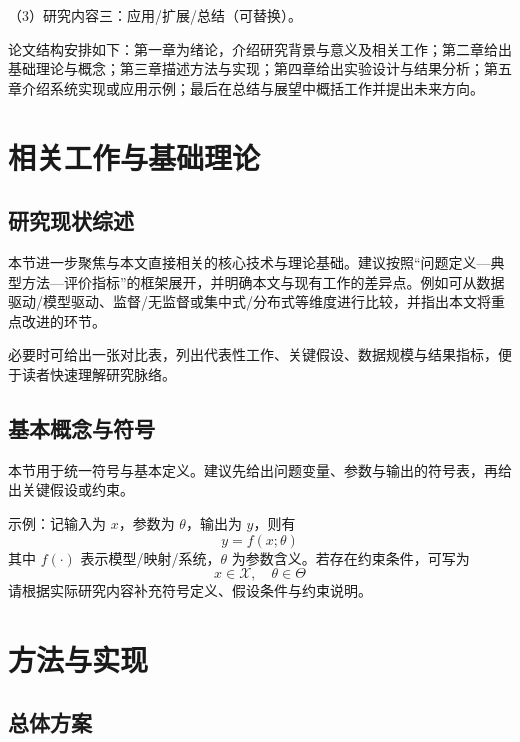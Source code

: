 \documentclass[unicode,master,submission,final]{scutthesis}
\begin{document}
（3）研究内容三：应用/扩展/总结（可替换）。

论文结构安排如下：第一章为绪论，介绍研究背景与意义及相关工作；第二章给出基础理论与概念；第三章描述方法与实现；第四章给出实验设计与结果分析；第五章介绍系统实现或应用示例；最后在总结与展望中概括工作并提出未来方向。

\chapter{相关工作与基础理论}

\section{研究现状综述}

本节进一步聚焦与本文直接相关的核心技术与理论基础。建议按照“问题定义—典型方法—评价指标”的框架展开，并明确本文与现有工作的差异点。例如可从数据驱动/模型驱动、监督/无监督或集中式/分布式等维度进行比较，并指出本文将重点改进的环节。

必要时可给出一张对比表，列出代表性工作、关键假设、数据规模与结果指标，便于读者快速理解研究脉络。

\section{基本概念与符号}

本节用于统一符号与基本定义。建议先给出问题变量、参数与输出的符号表，再给出关键假设或约束。

示例：记输入为 $x$，参数为 $\theta$，输出为 $y$，则有
\begin{equation}
    y = f(x; \theta)
\end{equation}
其中 $f(\cdot)$ 表示模型/映射/系统，$\theta$ 为参数含义。若存在约束条件，可写为
\begin{equation}
    x \in \mathcal X,\quad \theta \in \Theta
\end{equation}
请根据实际研究内容补充符号定义、假设条件与约束说明。

\chapter{方法与实现}

\section{总体方案}
\end{document}
